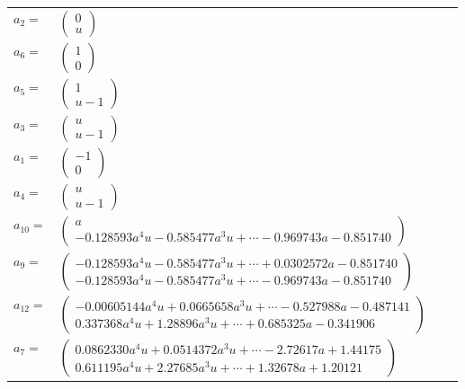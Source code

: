 \documentclass[1p]{elsarticle_modified}
\theoremstyle{definition}
\begin{document}
\begin{tabular}{m{7pt} m{180pt} m{7pt} m{180pt} }
\flushright $a_{2}=$&$\begin{pmatrix}0\\u\end{pmatrix}$ \\
\flushright $a_{6}=$&$\begin{pmatrix}1\\0\end{pmatrix}$ \\
\flushright $a_{5}=$&$\begin{pmatrix}1\\u-1\end{pmatrix}$ \\
\flushright $a_{3}=$&$\begin{pmatrix}u\\u-1\end{pmatrix}$ \\
\flushright $a_{1}=$&$\begin{pmatrix}-1\\0\end{pmatrix}$ \\
\flushright $a_{4}=$&$\begin{pmatrix}u\\u-1\end{pmatrix}$ \\
\flushright $a_{10}=$&$\begin{pmatrix}a\\-0.128593 a^{4} u-0.585477 a^{3} u+\cdots-0.969743 a-0.851740\end{pmatrix}$ \\
\flushright $a_{9}=$&$\begin{pmatrix}-0.128593 a^{4} u-0.585477 a^{3} u+\cdots+0.0302572 a-0.851740\\-0.128593 a^{4} u-0.585477 a^{3} u+\cdots-0.969743 a-0.851740\end{pmatrix}$ \\
\flushright $a_{12}=$&$\begin{pmatrix}-0.00605144 a^{4} u+0.0665658 a^{3} u+\cdots-0.527988 a-0.487141\\0.337368 a^{4} u+1.28896 a^{3} u+\cdots+0.685325 a-0.341906\end{pmatrix}$ \\
\flushright $a_{7}=$&$\begin{pmatrix}0.0862330 a^{4} u+0.0514372 a^{3} u+\cdots-2.72617 a+1.44175\\0.611195 a^{4} u+2.27685 a^{3} u+\cdots+1.32678 a+1.20121\end{pmatrix}$ \\

\end{tabular}
\end{document}
